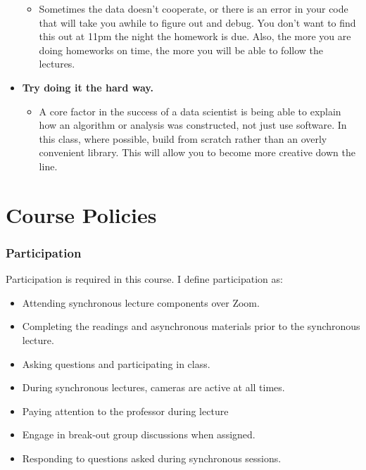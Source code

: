 \documentclass[
  12pt,
]{article}
\providecommand{\tightlist}{%
  \setlength{\itemsep}{0pt}\setlength{\parskip}{0pt}}
\begin{document}
\begin{itemize}
  \begin{itemize}
  \tightlist
  \item
    Sometimes the data doesn't cooperate, or there is an error in your
    code that will take you awhile to figure out and debug. You don't
    want to find this out at 11pm the night the homework is due. Also,
    the more you are doing homeworks on time, the more you will be able
    to follow the lectures.
  \end{itemize}
\item
  \textbf{Try doing it the hard way.}

  \begin{itemize}
  \tightlist
  \item
    A core factor in the success of a data scientist is being able to
    explain how an algorithm or analysis was constructed, not just use
    software. In this class, where possible, build from scratch rather
    than an overly convenient library. This will allow you to become
    more creative down the line.
  \end{itemize}
\end{itemize}

\hypertarget{course-policies}{%
\section{Course Policies}\label{course-policies}}

\hypertarget{participation}{%
\subsubsection{Participation}\label{participation}}

Participation is required in this course. I define participation as:

\begin{itemize}
\tightlist
\item
  Attending synchronous lecture components over Zoom.
\item
  Completing the readings and asynchronous materials prior to the
  synchronous lecture.
\item
  Asking questions and participating in class.
\item
  During synchronous lectures, cameras are active at all times.
\item
  Paying attention to the professor during lecture
\item
  Engage in break-out group discussions when assigned.
\item
  Responding to questions asked during synchronous sessions. 
\end{itemize}
\end{document}
